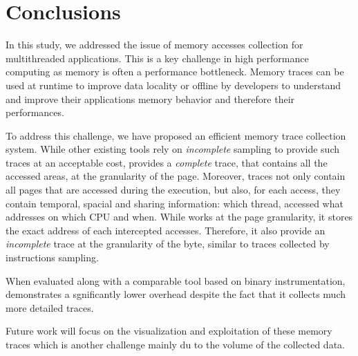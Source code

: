 \section{Conclusions}
\label{sec:cncl}

In this study, we addressed the issue of memory accesses collection for
multithreaded applications. This is a key challenge in high performance
computing as memory is often a performance
bottleneck. Memory traces can be used at runtime to improve data locality or
offline by developers to understand and improve their applications memory
behavior and therefore their performances.

To address this challenge, we have proposed \Moca an efficient memory trace
collection system. While other existing tools rely on \emph{incomplete} sampling to
provide such traces at an acceptable cost, \Moca provides a \emph{complete}
trace, that contains all the accessed areas, at the granularity of the page.
Moreover, \Moca traces not only
contain all pages that are accessed during the execution, but also, 
for each access, they contain temporal, spacial and sharing
information: which thread, accessed what addresses on which CPU and when.
While \Moca works at the page granularity, it stores the exact
address of each intercepted accesses. Therefore, it also provide an
\emph{incomplete} trace at the granularity of the byte, similar to
traces collected by instructions sampling.

When evaluated along with a comparable tool based on binary instrumentation,
\Moca demonstrates a sgnificantly lower overhead despite the fact that it collects
much more detailed traces.

Future work will focus on the visualization and exploitation of these memory traces
which is another challenge mainly du to the volume of the collected data.
